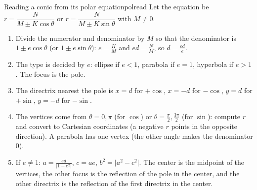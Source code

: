 \documentclass[11pt]{article}
\begin{document}
\begin{proc}{Reading a conic from its polar equation}{polread}
Let the equation be $r=\dfrac{N}{M\pm K\cos\theta}$ or $r=\dfrac{N}{M\pm K\sin\theta}$ with $M\ne0$.
\begin{enumerate}[nosep]
  \item Divide the numerator and denominator by $M$ so that the denominator is $1\pm e\cos\theta$ (or $1\pm e\sin\theta$): $e=\frac KM$ and $ed=\frac NM$, so $d=\frac{ed}e$.
  \item The type is decided by $e$: ellipse if $e<1$, parabola if $e=1$, hyperbola if $e>1$. The focus is the pole.
  \item The directrix nearest the pole is $x=d$ for $+\cos$, $x=-d$ for $-\cos$, $y=d$ for $+\sin$, $y=-d$ for $-\sin$.
  \item The vertices come from $\theta=0,\pi$ (for $\cos$) or $\theta=\frac\pi2,\frac{3\pi}2$ (for $\sin$): compute $r$ and convert to Cartesian coordinates (a negative $r$ points in the opposite direction). A parabola has one vertex (the other angle makes the denominator $0$).
  \item If $e\ne1$: $a=\frac{ed}{\lvert1-e^2\rvert}$, $c=ae$, $b^2=\lvert a^2-c^2\rvert$. The center is the midpoint of the vertices, the other focus is the reflection of the pole in the center, and the other directrix is the reflection of the first directrix in the center.
\end{enumerate}
\end{proc}
\end{document}
